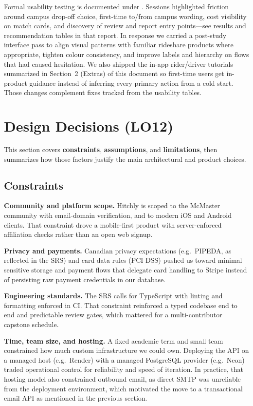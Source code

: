 \documentclass{article}
\begin{document}
Formal usability testing is documented under . Sessions highlighted friction around campus drop-off choice, first-time to/from campus wording, cost visibility on match cards, and discovery of review and report entry points---see results and recommendation tables in that report. In response we carried a post-study interface pass to align visual patterns with familiar rideshare products where appropriate, tighten colour consistency, and improve labels and hierarchy on flows that had caused hesitation. We also shipped the in-app rider/driver tutorials summarized in Section~2 (Extras) of this document so first-time users get in-product guidance instead of inferring every primary action from a cold start. Those changes complement fixes tracked from the usability tables.

\section{Design Decisions (LO12)}
\label{sec:lo12_design_decisions}

This section covers \textbf{constraints}, \textbf{assumptions}, and \textbf{limitations}, then summarizes how those factors justify the main architectural and product choices. 
\subsection{Constraints}

\noindent\textbf{Community and platform scope.} Hitchly is scoped to the McMaster community with email-domain verification, and to modern iOS and Android clients. That constraint drove a mobile-first product with server-enforced affiliation checks rather than an open web signup.

\noindent\textbf{Privacy and payments.} Canadian privacy expectations (e.g.\ PIPEDA, as reflected in the SRS) and card-data rules (PCI DSS) pushed us toward minimal sensitive storage and payment flows that delegate card handling to Stripe instead of persisting raw payment credentials in our database.

\noindent\textbf{Engineering standards.} The SRS calls for TypeScript with linting and formatting enforced in CI. That constraint reinforced a typed codebase end to end and predictable review gates, which mattered for a multi-contributor capstone schedule.

\noindent\textbf{Time, team size, and hosting.} A fixed academic term and small team constrained how much custom infrastructure we could own. Deploying the API on a managed host (e.g.\ Render) with a managed PostgreSQL provider (e.g.\ Neon) traded operational control for reliability and speed of iteration. In practice, that hosting model also constrained outbound email, as direct SMTP was unreliable from the deployment environment, which motivated the move to a transactional email API as mentioned in the previous section.
\end{document}
